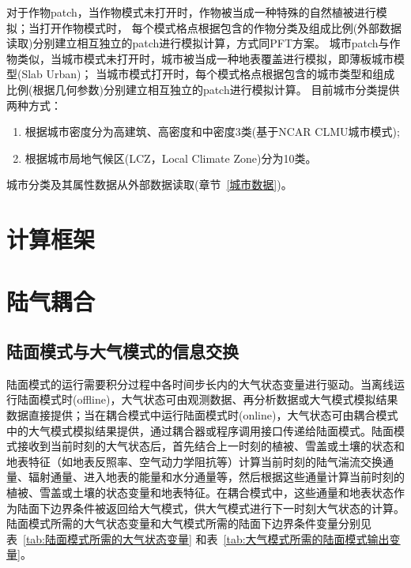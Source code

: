 对于作物patch，当作物模式未打开时，作物被当成一种特殊的自然植被进行模拟；当打开作物模式时，
每个模式格点根据包含的作物分类及组成比例(外部数据读取)分别建立相互独立的patch进行模拟计算，方式同PFT方案。
城市patch与作物类似，当城市模式未打开时，城市被当成一种地表覆盖进行模拟，即薄板城市模型(Slab Urban)；
当城市模式打开时，每个模式格点根据包含的城市类型和组成比例(根据几何参数)分别建立相互独立的patch进行模拟计算。
目前城市分类提供两种方式：
\begin{enumerate}
    \item 根据城市密度分为高建筑、高密度和中密度3类(基于NCAR CLMU城市模式);
    \item 根据城市局地气候区(LCZ，Local Climate Zone)分为10类。
\end{enumerate}
城市分类及其属性数据从外部数据读取(章节~\ref{城市数据})。

\section{计算框架}\label{计算框架}



\section{陆气耦合}\label{陆气耦合}
\subsection{陆面模式与大气模式的信息交换}
陆面模式的运行需要积分过程中各时间步长内的大气状态变量进行驱动。当离线运行陆面模式时(offline)，大气状态可由观测数据、再分析数据或大气模式模拟结果数据直接提供；当在耦合模式中运行陆面模式时(online)，大气状态可由耦合模式中的大气模式模拟结果提供，通过耦合器或程序调用接口传递给陆面模式。陆面模式接收到当前时刻的大气状态后，首先结合上一时刻的植被、雪盖或土壤的状态和地表特征（如地表反照率、空气动力学阻抗等）计算当前时刻的陆气湍流交换通量、辐射通量、进入地表的能量和水分通量等，然后根据这些通量计算当前时刻的植被、雪盖或土壤的状态变量和地表特征。在耦合模式中，这些通量和地表状态作为陆面下边界条件被返回给大气模式，供大气模式进行下一时刻大气状态的计算。陆面模式所需的大气状态变量和大气模式所需的陆面下边界条件变量分别见表~\ref{tab:陆面模式所需的大气状态变量} 和表~\ref{tab:大气模式所需的陆面模式输出变量}。


